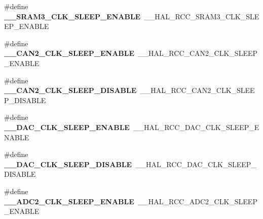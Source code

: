 \begin{DoxyCompactItemize}
\item 
\#define {\bfseries \+\_\+\+\_\+\+S\+R\+A\+M3\+\_\+\+C\+L\+K\+\_\+\+S\+L\+E\+E\+P\+\_\+\+E\+N\+A\+B\+LE}~\+\_\+\+\_\+\+H\+A\+L\+\_\+\+R\+C\+C\+\_\+\+S\+R\+A\+M3\+\_\+\+C\+L\+K\+\_\+\+S\+L\+E\+E\+P\+\_\+\+E\+N\+A\+B\+LE\hypertarget{group___h_a_l___r_c_c___aliased_ga81ad4f9659b142d685e57aff534047cc}{}\label{group___h_a_l___r_c_c___aliased_ga81ad4f9659b142d685e57aff534047cc}

\item 
\#define {\bfseries \+\_\+\+\_\+\+C\+A\+N2\+\_\+\+C\+L\+K\+\_\+\+S\+L\+E\+E\+P\+\_\+\+E\+N\+A\+B\+LE}~\+\_\+\+\_\+\+H\+A\+L\+\_\+\+R\+C\+C\+\_\+\+C\+A\+N2\+\_\+\+C\+L\+K\+\_\+\+S\+L\+E\+E\+P\+\_\+\+E\+N\+A\+B\+LE\hypertarget{group___h_a_l___r_c_c___aliased_ga0ba6af31be85ac831c35647b797b5e7b}{}\label{group___h_a_l___r_c_c___aliased_ga0ba6af31be85ac831c35647b797b5e7b}

\item 
\#define {\bfseries \+\_\+\+\_\+\+C\+A\+N2\+\_\+\+C\+L\+K\+\_\+\+S\+L\+E\+E\+P\+\_\+\+D\+I\+S\+A\+B\+LE}~\+\_\+\+\_\+\+H\+A\+L\+\_\+\+R\+C\+C\+\_\+\+C\+A\+N2\+\_\+\+C\+L\+K\+\_\+\+S\+L\+E\+E\+P\+\_\+\+D\+I\+S\+A\+B\+LE\hypertarget{group___h_a_l___r_c_c___aliased_ga16eabcc8f86bb233d98aae3e2891fb3d}{}\label{group___h_a_l___r_c_c___aliased_ga16eabcc8f86bb233d98aae3e2891fb3d}

\item 
\#define {\bfseries \+\_\+\+\_\+\+D\+A\+C\+\_\+\+C\+L\+K\+\_\+\+S\+L\+E\+E\+P\+\_\+\+E\+N\+A\+B\+LE}~\+\_\+\+\_\+\+H\+A\+L\+\_\+\+R\+C\+C\+\_\+\+D\+A\+C\+\_\+\+C\+L\+K\+\_\+\+S\+L\+E\+E\+P\+\_\+\+E\+N\+A\+B\+LE\hypertarget{group___h_a_l___r_c_c___aliased_ga9838ddb17caefb289bc820d7725d23d3}{}\label{group___h_a_l___r_c_c___aliased_ga9838ddb17caefb289bc820d7725d23d3}

\item 
\#define {\bfseries \+\_\+\+\_\+\+D\+A\+C\+\_\+\+C\+L\+K\+\_\+\+S\+L\+E\+E\+P\+\_\+\+D\+I\+S\+A\+B\+LE}~\+\_\+\+\_\+\+H\+A\+L\+\_\+\+R\+C\+C\+\_\+\+D\+A\+C\+\_\+\+C\+L\+K\+\_\+\+S\+L\+E\+E\+P\+\_\+\+D\+I\+S\+A\+B\+LE\hypertarget{group___h_a_l___r_c_c___aliased_ga9142ad3f5c2df9a2613f6cb16ba7fa67}{}\label{group___h_a_l___r_c_c___aliased_ga9142ad3f5c2df9a2613f6cb16ba7fa67}

\item 
\#define {\bfseries \+\_\+\+\_\+\+A\+D\+C2\+\_\+\+C\+L\+K\+\_\+\+S\+L\+E\+E\+P\+\_\+\+E\+N\+A\+B\+LE}~\+\_\+\+\_\+\+H\+A\+L\+\_\+\+R\+C\+C\+\_\+\+A\+D\+C2\+\_\+\+C\+L\+K\+\_\+\+S\+L\+E\+E\+P\+\_\+\+E\+N\+A\+B\+LE\hypertarget{group___h_a_l___r_c_c___aliased_gafe24a48e39c495dbd65a3b0b0703d7a5}{}\label{group___h_a_l___r_c_c___aliased_gafe24a48e39c495dbd65a3b0b0703d7a5}


\end{DoxyCompactItemize}

